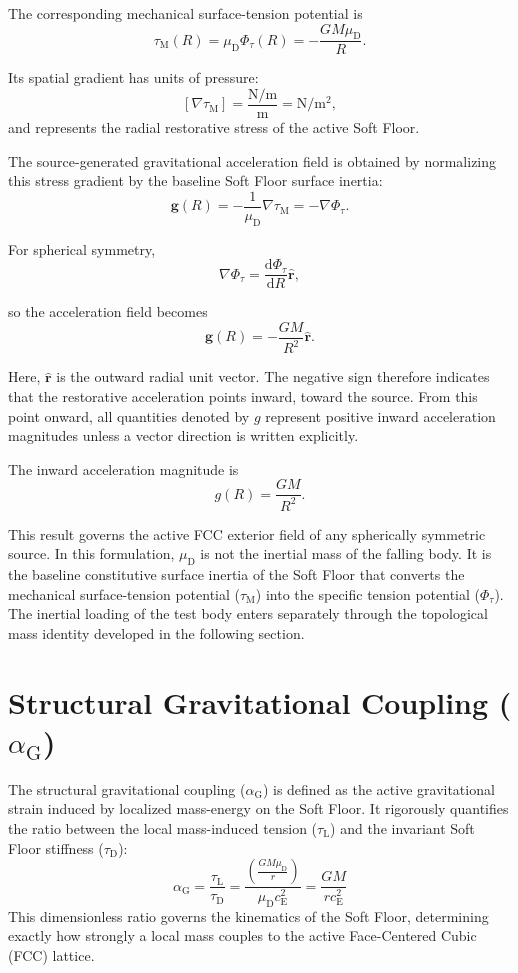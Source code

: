 The corresponding mechanical surface-tension potential is
$$\tau_{\mathrm{M}}(R) = \mu_{\mathrm{D}}\Phi_{\tau}(R) = -\frac{GM\mu_{\mathrm{D}}}{R}.$$

Its spatial gradient has units of pressure:
$$[\nabla\tau_{\mathrm{M}}] = \frac{\mathrm{N/m}}{\mathrm{m}} = \mathrm{N/m^2},$$
and represents the radial restorative stress of the active Soft Floor.

The source-generated gravitational acceleration field is obtained by normalizing this stress gradient by the baseline Soft Floor surface inertia:
$$\mathbf{g}(R) = -\frac{1}{\mu_{\mathrm{D}}} \nabla\tau_{\mathrm{M}} = -\nabla\Phi_{\tau}.$$

For spherical symmetry,
$$\nabla\Phi_{\tau} = \frac{\mathrm{d}\Phi_{\tau}}{\mathrm{d}R} \hat{\mathbf{r}},$$

so the acceleration field becomes
$$\mathbf{g}(R) = -\frac{GM}{R^2} \hat{\mathbf{r}}.$$

Here, $\hat{\mathbf{r}}$ is the outward radial unit vector. The negative sign therefore indicates that the restorative acceleration points inward, toward the source. From this point onward, all quantities denoted by $g$ represent positive inward acceleration magnitudes unless a vector direction is written explicitly.

The inward acceleration magnitude is
$$g(R) = \frac{GM}{R^2}.$$

This result governs the active FCC exterior field of any spherically symmetric source. In this formulation, $\mu_{\mathrm{D}}$ is not the inertial mass of the falling body. It is the baseline constitutive surface inertia of the Soft Floor that converts the mechanical surface-tension potential ($\tau_{\mathrm{M}}$) into the specific tension potential ($\Phi_{\tau}$). The inertial loading of the test body enters separately through the topological mass identity developed in the following section.

\section{Structural Gravitational Coupling ($\alpha_{\mathrm{G}}$)}
\label{sec:gravitational_coupling_alpha}
The structural gravitational coupling ($\alpha_{\mathrm{G}}$) is defined as the active gravitational strain induced by localized mass-energy on the Soft Floor. It rigorously quantifies the ratio between the local mass-induced tension ($\tau_{\mathrm{L}}$) and the invariant Soft Floor stiffness ($\tau_{\mathrm{D}}$):
\begin{equation}
    \alpha_{\mathrm{G}} = \frac{\tau_{\mathrm{L}}}{\tau_{\mathrm{D}}} = \frac{\left(\frac{G M \mu_{\mathrm{D}}}{r}\right)}{\mu_{\mathrm{D}} c_{\mathrm{E}}^2} = \frac{G M}{r c_{\mathrm{E}}^2}
\end{equation}
This dimensionless ratio governs the kinematics of the Soft Floor, determining exactly how strongly a local mass couples to the active Face-Centered Cubic (FCC) lattice.

